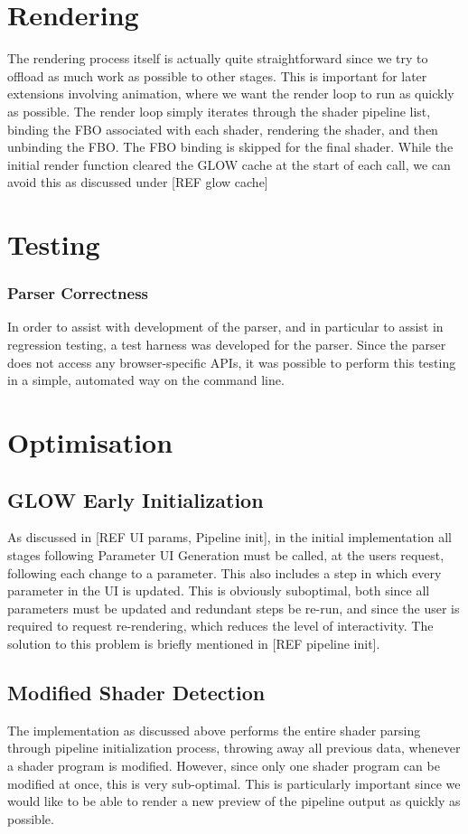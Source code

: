 \documentclass[12pt,twoside,notitlepage]{report}
\begin{document}
\section{Rendering}
The rendering process itself is actually quite straightforward since we try to offload as much work as possible to other stages. This is important for later extensions involving animation, where we want the render loop to run as quickly as possible. The render loop simply iterates through the shader pipeline list, binding the FBO associated with each shader, rendering the shader, and then unbinding the FBO. The FBO binding is skipped for the final shader. While the initial render function cleared the GLOW cache at the start of each call, we can avoid this as discussed under [REF glow cache]


\section{Testing}
\subsubsection{Parser Correctness}
In order to assist with development of the parser, and in particular to assist in regression testing, a test harness was developed for the parser. Since the parser does not access any browser-specific APIs, it was possible to perform this testing in a simple, automated way on the command line.

\section{Optimisation}\subsection{GLOW Early Initialization}
As discussed in [REF UI params, Pipeline init], in the initial implementation all stages following Parameter UI Generation must be called, at the users request, following each change to a parameter. This also includes a step in which every parameter in the UI is updated. This is obviously suboptimal, both since all parameters must be updated and redundant steps be re-run, and since the user is required to request re-rendering, which reduces the level of interactivity.
The solution to this problem is briefly mentioned in [REF pipeline init].

\subsection{Modified Shader Detection}
The implementation as discussed above performs the entire shader parsing through pipeline initialization process, throwing away all previous data, whenever a shader program is modified. However, since only one shader program can be modified at once, this is very sub-optimal. This is particularly important since we would like to be able to render a new preview of the pipeline output as quickly as possible.
\end{document}
